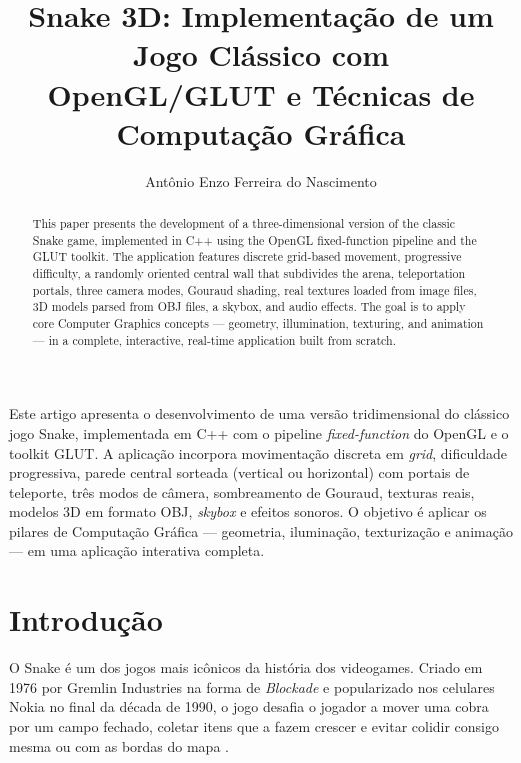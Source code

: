 \documentclass[12pt]{article}
\title{Snake 3D: Implementação de um Jogo Clássico com\\
       OpenGL/GLUT e Técnicas de Computação Gráfica}
\author{Antônio Enzo Ferreira do Nascimento}
\begin{document}
\maketitle

\begin{abstract}
  This paper presents the development of a three-dimensional version of the
  classic Snake game, implemented in C++ using the OpenGL fixed-function
  pipeline and the GLUT toolkit. The application features discrete grid-based
  movement, progressive difficulty, a randomly oriented central wall that
  subdivides the arena, teleportation portals, three camera modes, Gouraud
  shading, real textures loaded from image files, 3D models parsed from OBJ
  files, a skybox, and audio effects. The goal is to apply core Computer
  Graphics concepts — geometry, illumination, texturing, and animation — in
  a complete, interactive, real-time application built from scratch.
\end{abstract}

\begin{resumo}
  Este artigo apresenta o desenvolvimento de uma versão tridimensional do
  clássico jogo Snake, implementada em C++ com o pipeline \textit{fixed-function}
  do OpenGL e o toolkit GLUT. A aplicação incorpora movimentação discreta em
  \textit{grid}, dificuldade progressiva, parede central sorteada (vertical ou
  horizontal) com portais de teleporte, três modos de câmera, sombreamento de
  Gouraud, texturas reais, modelos 3D em formato OBJ, \textit{skybox} e efeitos
  sonoros. O objetivo é aplicar os pilares de Computação Gráfica — geometria,
  iluminação, texturização e animação — em uma aplicação interativa completa.
\end{resumo}

\section{Introdução}

O Snake é um dos jogos mais icônicos da história dos videogames. Criado em 1976
por Gremlin Industries na forma de \textit{Blockade} e popularizado nos celulares
Nokia no final da década de 1990, o jogo desafia o jogador a mover uma cobra por
um campo fechado, coletar itens que a fazem crescer e evitar colidir consigo
mesma ou com as bordas do mapa \cite{wolf:12}.
\end{document}
